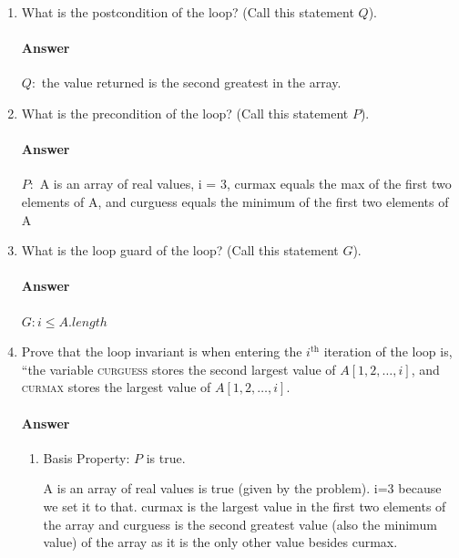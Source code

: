 \documentclass{article}
\begin{document}
\begin{enumerate}
    \item What is the postcondition of the loop? (Call this statement $Q$).

        \paragraph{Answer}

        $Q\colon$ the value returned is the second greatest in the array.

    \item What is the precondition of the loop? (Call this statement $P$).

        \paragraph{Answer}

       $P\colon$ A is an array of real values, i = 3, curmax equals the max of the first two elements of A, and curguess equals the minimum of the first two elements of A

    \item What is the loop guard of the loop? (Call this statement $G$).

        \paragraph{Answer}

        $G\colon i \leq A.length$

    \item Prove that the loop invariant is when entering the $i^\text{th}$
        iteration of the loop is, ``the variable \textsc{curguess} stores
        the second
        largest value of $A[1,2, \ldots, i]$,
        and \textsc{curmax} stores the largest value of $A[1,2,\ldots, i]$.

        \paragraph{Answer}
\begin{enumerate}
	\item Basis Property: $P$ is true.
	
	A is an array of real values is true (given by the problem). i=3 because we set it to that. curmax is the largest value in the first two elements of the array and curguess is the second greatest value (also the minimum value) of the array as it is the only other value besides curmax.
	

\end{enumerate}
\end{enumerate}
\end{document}
